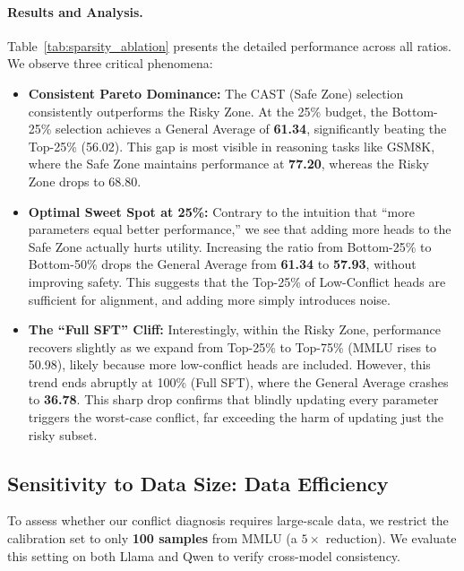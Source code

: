 \documentclass[11pt]{article}
\begin{document}
\paragraph{Results and Analysis.}
Table~\ref{tab:sparsity_ablation} presents the detailed performance across all ratios. We observe three critical phenomena:

\begin{itemize}[leftmargin=*]
    \item \textbf{Consistent Pareto Dominance:} The CAST (Safe Zone) selection consistently outperforms the Risky Zone. At the 25\% budget, the Bottom-25\% selection achieves a General Average of \textbf{61.34}, significantly beating the Top-25\% (56.02). This gap is most visible in reasoning tasks like GSM8K, where the Safe Zone maintains performance at \textbf{77.20}, whereas the Risky Zone drops to 68.80.

    \item \textbf{Optimal Sweet Spot at 25\%:} Contrary to the intuition that ``more parameters equal better performance,'' we see that adding more heads to the Safe Zone actually hurts utility. Increasing the ratio from Bottom-25\% to Bottom-50\% drops the General Average from \textbf{61.34} to \textbf{57.93}, without improving safety. This suggests that the Top-25\% of Low-Conflict heads are sufficient for alignment, and adding more simply introduces noise.

    \item \textbf{The ``Full SFT'' Cliff:} Interestingly, within the Risky Zone, performance recovers slightly as we expand from Top-25\% to Top-75\% (MMLU rises to 50.98), likely because more low-conflict heads are included. However, this trend ends abruptly at 100\% (Full SFT), where the General Average crashes to \textbf{36.78}. This sharp drop confirms that blindly updating every parameter triggers the worst-case conflict, far exceeding the harm of updating just the risky subset.
\end{itemize}


\subsection{Sensitivity to Data Size: Data Efficiency}
\label{sec:data_efficiency}

To assess whether our conflict diagnosis requires large-scale data, we restrict the calibration set to only \textbf{100 samples} from MMLU (a $5\times$ reduction). We evaluate this setting on both Llama and Qwen to verify cross-model consistency.
\end{document}
